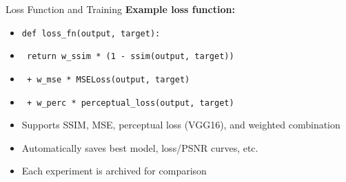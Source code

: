 \documentclass{beamer}
\begin{document}
\begin{frame}{Loss Function and Training}
\textbf{Example loss function:}
\begin{itemize}
    \item \texttt{def loss_fn(output, target):}
    \item \texttt{\hspace{1em} return w_ssim * (1 - ssim(output, target))}
    \item \texttt{\hspace{2em} + w_mse * MSELoss(output, target)}
    \item \texttt{\hspace{2em} + w_perc * perceptual_loss(output, target)}
\end{itemize}
\vspace{0.5em}
\begin{itemize}
    \item Supports SSIM, MSE, perceptual loss (VGG16), and weighted combination
    \item Automatically saves best model, loss/PSNR curves, etc.
    \item Each experiment is archived for comparison
\end{itemize}
\end{frame}
\end{document}

